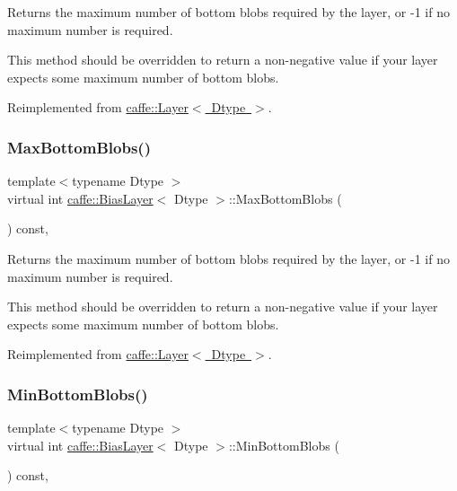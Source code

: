 Returns the maximum number of bottom blobs required by the layer, or -\/1 if no maximum number is required. 

This method should be overridden to return a non-\/negative value if your layer expects some maximum number of bottom blobs. 

Reimplemented from \mbox{\hyperlink{classcaffe_1_1_layer_af8bdc989053e0363ab032026b46de7c3}{caffe\+::\+Layer$<$ Dtype $>$}}.

\mbox{\label{classcaffe_1_1_bias_layer_abdb89e3bc940f999d1d4da83de90a97c}} 
\subsubsection{\texorpdfstring{Max\+Bottom\+Blobs()}{MaxBottomBlobs()}\hspace{0.1cm}{\footnotesize\ttfamily [2/2]}}
{\footnotesize\ttfamily template$<$typename Dtype $>$ \\
virtual int \mbox{\hyperlink{classcaffe_1_1_bias_layer}{caffe\+::\+Bias\+Layer}}$<$ Dtype $>$\+::Max\+Bottom\+Blobs (\begin{DoxyParamCaption}{ }\end{DoxyParamCaption}) const\hspace{0.3cm}{\ttfamily [inline]}, {\ttfamily [virtual]}}



Returns the maximum number of bottom blobs required by the layer, or -\/1 if no maximum number is required. 

This method should be overridden to return a non-\/negative value if your layer expects some maximum number of bottom blobs. 

Reimplemented from \mbox{\hyperlink{classcaffe_1_1_layer_af8bdc989053e0363ab032026b46de7c3}{caffe\+::\+Layer$<$ Dtype $>$}}.

\mbox{\label{classcaffe_1_1_bias_layer_ab75a2e05bbb1eb37bed5995288143f67}} 
\subsubsection{\texorpdfstring{Min\+Bottom\+Blobs()}{MinBottomBlobs()}\hspace{0.1cm}{\footnotesize\ttfamily [1/2]}}
{\footnotesize\ttfamily template$<$typename Dtype $>$ \\
virtual int \mbox{\hyperlink{classcaffe_1_1_bias_layer}{caffe\+::\+Bias\+Layer}}$<$ Dtype $>$\+::Min\+Bottom\+Blobs (\begin{DoxyParamCaption}{ }\end{DoxyParamCaption}) const\hspace{0.3cm}{\ttfamily [inline]}, {\ttfamily [virtual]}}



